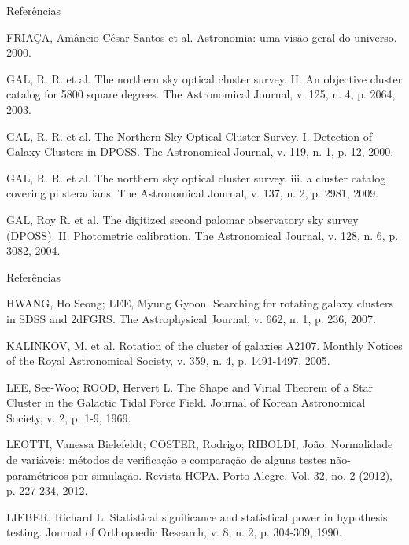 \documentclass[xcolor=dvipsnames,10pt]{beamer}
\begin{document}
\begin{frame}{Referências}
  \begin{thebibliography}{9}
  \fontsize{8}{0}\selectfont
  FRIAÇA, Amâncio César Santos et al. Astronomia: uma visão geral do universo. 2000.

  GAL, R. R. et al. The northern sky optical cluster survey. II. An objective cluster catalog for 5800 square degrees. The Astronomical Journal, v. 125, n. 4, p. 2064, 2003.

  GAL, R. R. et al. The Northern Sky Optical Cluster Survey. I. Detection of Galaxy Clusters in DPOSS. The Astronomical Journal, v. 119, n. 1, p. 12, 2000.

  GAL, R. R. et al. The northern sky optical cluster survey. iii. a cluster catalog covering pi steradians. The Astronomical Journal, v. 137, n. 2, p. 2981, 2009.

  GAL, Roy R. et al. The digitized second palomar observatory sky survey (DPOSS). II. Photometric calibration. The Astronomical Journal, v. 128, n. 6, p. 3082, 2004.
  \end{thebibliography}
\end{frame}

\begin{frame}{Referências}
  \begin{thebibliography}{9}
  \fontsize{8}{0}\selectfont
  HWANG, Ho Seong; LEE, Myung Gyoon. Searching for rotating galaxy clusters in SDSS and 2dFGRS. The Astrophysical Journal, v. 662, n. 1, p. 236, 2007.

  KALINKOV, M. et al. Rotation of the cluster of galaxies A2107. Monthly Notices of the Royal Astronomical Society, v. 359, n. 4, p. 1491-1497, 2005.

  LEE, See-Woo; ROOD, Hervert L. The Shape and Virial Theorem of a Star Cluster in the Galactic Tidal Force Field. Journal of Korean Astronomical Society, v. 2, p. 1-9, 1969.

  LEOTTI, Vanessa Bielefeldt; COSTER, Rodrigo; RIBOLDI, João. Normalidade de variáveis: métodos de verificação e comparação de alguns testes não-paramétricos por simulação. Revista HCPA. Porto Alegre. Vol. 32, no. 2 (2012), p. 227-234, 2012.

  LIEBER, Richard L. Statistical significance and statistical power in hypothesis testing. Journal of Orthopaedic Research, v. 8, n. 2, p. 304-309, 1990.
  \end{thebibliography}
\end{frame}
\end{document}
